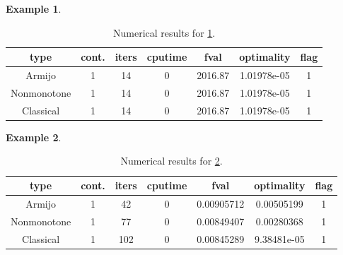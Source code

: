 \documentclass[a4paper]{article}
\newtheorem{example}{Example}
\newcommand{\mr}{\mathbb{R}}
\newcommand{\co}[1]{{\con{#1}}}
\begin{document}
  
  
  \begin{example}\label{exp8}
  \end{example}
  
  \begin{table}[p]
    \centering
    \begin{tabular}{cc|ccccc}
      \hline
      type & cont. & iters & cputime & 
      fval & optimality & flag \\ \hline
      Armijo & 1 & 14 & 0 & 2016.87 & 1.01978e-05 & 1 \\
      Nonmonotone & 1 & 14 & 0 & 2016.87 & 1.01978e-05 & 1 \\
      Classical & 1 & 14 & 0 & 2016.87 & 1.01978e-05 & 1 \\
      \hline
    \end{tabular}
    \caption{Numerical results for \cref{exp8}.}
    \label{tab8}
  \end{table}

\begin{example}\label{exp9}
\end{example}

\begin{table}[p]
  \centering
  \begin{tabular}{cc|ccccc}
    \hline
    type & cont. & iters & cputime & 
    fval & optimality & flag \\ \hline
    Armijo & 1 & 42 & 0 & 0.00905712 & 0.00505199 & 1 \\
    Nonmonotone & 1 & 77 & 0 & 0.00849407 & 0.00280368 & 1 \\
    Classical & 1 & 102 & 0 & 0.00845289 & 9.38481e-05 & 1 \\
    \hline
  \end{tabular}
  \caption{Numerical results for \cref{exp9}.}
  \label{tab9}
\end{table}
  
\end{document}
